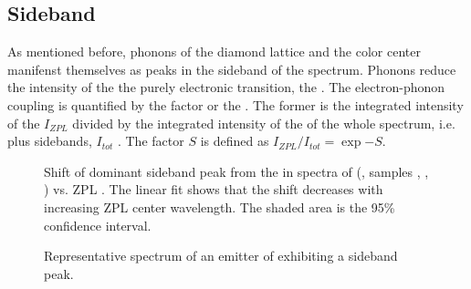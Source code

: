


	\subsection{Sideband} \label{subsubsec::sideband}

		As mentioned before, phonons of the diamond lattice and the color center manifenst themselves as peaks in the sideband of the \pl spectrum. 
		Phonons reduce the intensity of the the purely electronic transition, the \zpl.
		The electron-phonon coupling is quantified by the \db factor or the \hr. 
		The former is the integrated intensity of the \zpl $I_{ZPL}$ divided by the integrated intensity of the \pl of the whole spectrum, i.e. \ZPL plus sidebands, $I_{tot}$ \cite{Neu2014,Gaebel2004}.
		The \hr factor $S$ is defined as $I_{ZPL}/I_{tot}=\exp{-S}$.
		

		\begin{figure}[tp]
			\centering
			\caption{Shift of dominant sideband peak from the \ZPL in spectra of \sivs (\gv, samples \insituF, \insituS, \insituH) vs. ZPL \cwl. The linear fit shows that the shift decreases with increasing ZPL center wavelength. The shaded area is the 95\% confidence interval.}
			\label{fig::sideband_fit}
		\end{figure}

		\begin{figure}[tp]
			\centering
			\caption{Representative spectrum of an emitter of \gv exhibiting a sideband peak.}
			\label{fig::broad_peak_sb}
		\end{figure}


